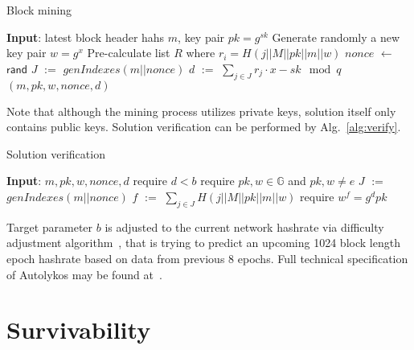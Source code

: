 \documentclass[]{article}
\def\Let#1#2{\State #1 $:=$ #2}
\def\LetRnd#1#2{\State #1 $\gets$ #2}
\begin{document}
    \begin{algorithm}[H]
        \caption{Block mining}
        \label{alg:prove}
        \begin{algorithmic}[1]
            \State \textbf{Input}: latest block header hahs $m$, key pair $pk=g^{sk}$
            \State Generate randomly a new key pair $w=g^x$
            \State Pre-calculate list $R$ where $r_i=H(j||M||pk||m||w)$
            \LetRnd{$nonce$}{$\mathsf{rand}$}
            \Let{$J$}{$genIndexes(m||nonce)$}
            \Let{$d$}{$\sum_{j \in J}{r_j} \cdot x - sk \mod q$}
            \State \Return $(m,pk,w,nonce,d)$
            \EndIf
            \EndWhile
        \end{algorithmic}
    \end{algorithm}

    Note that although the mining process utilizes private keys, solution itself
    only contains public keys. Solution verification can be performed by Alg.~\ref{alg:verify}.

    \begin{algorithm}[H]
        \caption{Solution verification}
        \label{alg:verify}
        \begin{algorithmic}[1]
            \State \textbf{Input}: $m,pk,w,nonce,d$
            \State require $d < b$
            \State require $pk,w\in \mathbb{G}$ and $pk,w \ne e$
            \Let{$J$}{$genIndexes(m||nonce)$}
            \Let{$f$}{$\sum_{j \in J} H(j||M||pk||m||w)$}
            \State require $w^f = g^dpk$
        \end{algorithmic}
    \end{algorithm}

    Target parameter $b$ is adjusted to the current network hashrate via difficulty adjustment
    algorithm~\cite{meshkov2017short}, that is trying to predict an upcoming 1024 block length
    epoch hashrate based on data from previous 8 epochs.
    Full technical specification of Autolykos may be found at~\cite{Ergopow}.

    \section{Survivability}
    \label{sec:survivability}

\end{document}
